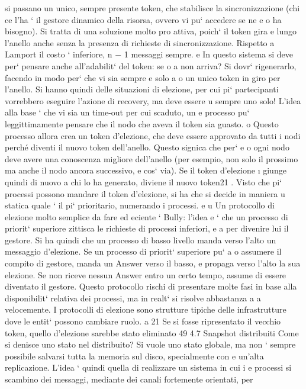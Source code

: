 \documentclass[a4paper,12pt]{article}
\begin{document}
si passano un unico, sempre presente token, che stabilisce la sincronizzazione
(chi ce l'ha ` il gestore dinamico della risorsa, ovvero vi pu` accedere se ne
e
o
ha bisogno). Si tratta di una soluzione molto pro attiva, poich` il token gira
e
lungo l'anello anche senza la presenza di richieste di sincronizzazione. Rispetto
a Lamport il costo ` inferiore, n $-$ 1 messaggi sempre.
e
In questo sistema si deve per` pensare anche all'adabilit` del token: se
o
a
non arriva? Si dovr` rigenerarlo, facendo in modo per` che vi sia sempre e solo
a
o
un unico token in giro per l'anello. Si hanno quindi delle situazioni di elezione,
per cui pi` partecipanti vorrebbero eseguire l'azione di recovery, ma deve essere
u
sempre uno solo! L'idea alla base ` che vi sia un time-out per cui scaduto, un
e
processo pu` leggittimamente pensare che il nodo che aveva il token sia guasto.
o
Questo processo allora crea un token d'elezione, che deve essere approvato da
tutti i nodi perché diventi il nuovo token dell'anello. Questo signica che per`
e
o
ogni nodo deve avere una conoscenza migliore dell'anello (per esempio, non solo
il prossimo ma anche il nodo ancora successivo, e cos` via). Se il token d'elezione
\i{}
giunge quindi di nuovo a chi lo ha generato, diviene il nuovo token21 . Visto che
pi` processi possono mandare il token d'elezione, si ha che si decide in maniera
u
statica quale ` il pi` prioritario, numerando i processi.
e
u
Un protocollo di elezione molto semplice da fare ed eciente ` Bully: l'idea
e
` che un processo di priorit` superiore zittisca le richieste di processi inferiori,
e
a
per divenire lui il gestore. Si ha quindi che un processo di basso livello manda
verso l'alto un messaggio d'elezione. Se un processo di priorit` superiore pu`
a
o
assumere il compito di gestore, manda un Answer verso il basso, e propaga verso
l'alto la sua elezione. Se non riceve nessun Answer entro un certo tempo, assume
di essere diventato il gestore. Questo protocollo rischi di presentare molte fasi
in base alla disponibilit` relativa dei processi, ma in realt` si risolve abbastanza
a
a
velocemente. I protocolli di elezione sono strutture tipiche delle infrastrutture
dove le entit` possono cambiare ruolo.
a
21 Se
si fosse ripresentato il vecchio token, quello d'elezione sarebbe stato eliminato
49
4.7
Snapshot distribuiti
Come si denisce uno stato nel distribuito? Si vuole uno stato globale, ma
non ` sempre possibile salvarsi tutta la memoria sul disco, specialmente con
e
un'alta replicazione. L'idea ` quindi quella di realizzare un sistema in cui i
e
processi si scambino dei messaggi, mediante dei canali fortemente orientati, per
\end{document}

